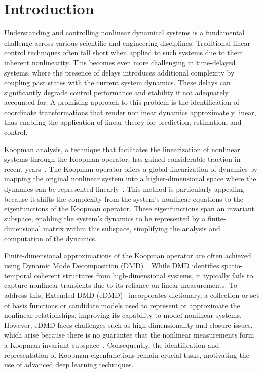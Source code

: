 \documentclass[conference]{IEEEtran}
\begin{document}
\section{Introduction}
Understanding and controlling nonlinear dynamical systems is a fundamental challenge across various scientific and engineering disciplines. Traditional linear control techniques often fall short when applied to such systems due to their inherent nonlinearity. This becomes even more challenging in time-delayed systems, where the presence of delays introduces additional complexity by coupling past states with the current system dynamics. These delays can significantly degrade control performance and stability if not adequately accounted for. A promising approach to this problem is the identification of coordinate transformations that render nonlinear dynamics approximately linear, thus enabling the application of linear theory for prediction, estimation, and control.

Koopman analysis, a technique that facilitates the linearization of nonlinear systems through the Koopman operator, has gained considerable traction in recent years~\cite{Wilson2023siamkoopman, Mauroy2016cdc}. The Koopman operator offers a global linearization of dynamics by mapping the original nonlinear system into a higher-dimensional space where the dynamics can be represented linearly~\cite{Mezic2004101, Mezić2005}.
This method is particularly appealing because it shifts the complexity from the system's nonlinear equations to the eigenfunctions of the Koopman operator. These eigenfunctions span an invariant subspace, enabling the system's dynamics to be represented by a finite-dimensional matrix within this subspace, simplifying the analysis and computation of the dynamics.

Finite-dimensional approximations of the Koopman operator are often achieved using Dynamic Mode Decomposition (DMD)~\cite{schmid2010dynamic}. While DMD identifies spatio-temporal coherent structures from high-dimensional systems, it typically fails to capture nonlinear transients due to its reliance on linear measurements. To address this, Extended DMD (eDMD)~\cite{williams2015data} incorporates dictionary, a collection or set of basis functions or candidate models used to represent or approximate the nonlinear relationships, improving its capability to model nonlinear systems. However, eDMD faces challenges such as high dimensionality and closure issues, which arise because there is no guarantee that the nonlinear measurements form a Koopman invariant subspace~\cite{Lusch2018}. Consequently, the identification and representation of Koopman eigenfunctions remain crucial tasks, motivating the use of advanced deep learning techniques.
\end{document}
